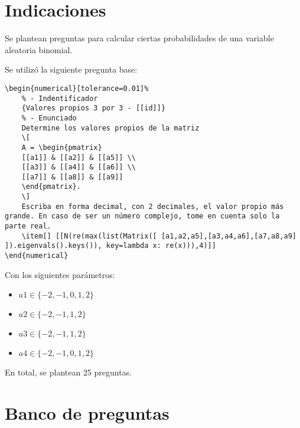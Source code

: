 \documentclass[a4,11pt]{aleph-notas}
\begin{document}
\encabezado

\vspace*{-8mm}
\section{Indicaciones}

Se plantean preguntas para calcular ciertas probabilidades de una variable aleatoria binomial.



Se utilizó la siguiente pregunta base:
\begin{lstlisting}[breaklines]
\begin{numerical}[tolerance=0.01]%
    % - Indentificador
    {Valores propios 3 por 3 - [[id]]}
    % - Enunciado
    Determine los valores propios de la matriz
    \[
    A = \begin{pmatrix}
    [[a1]] & [[a2]] & [[a5]] \\
    [[a3]] & [[a4]] & [[a6]] \\
    [[a7]] & [[a8]] & [[a9]]
    \end{pmatrix}.
    \]
    Escriba en forma decimal, con 2 decimales, el valor propio más grande. En caso de ser un número complejo, tome en cuenta solo la parte real.
    \item[] [[N(re(max(list(Matrix([ [a1,a2,a5],[a3,a4,a6],[a7,a8,a9] ]).eigenvals().keys()), key=lambda x: re(x))),4)]]
\end{numerical}

\end{lstlisting}
\noindent
Con los siguientes parámetros:
\begin{itemize}
	\item $a1 \in \{-2, -1, 0, 1, 2\}$
	\item $a2 \in \{-2, -1, 1, 2\}$
	\item $a3 \in \{-2, -1, 1, 2\}$
	\item $a4 \in \{-2, -1, 0, 1, 2\}$

\end{itemize}
En total, se plantean 25 preguntas.


\section{Banco de preguntas}
\end{document}

